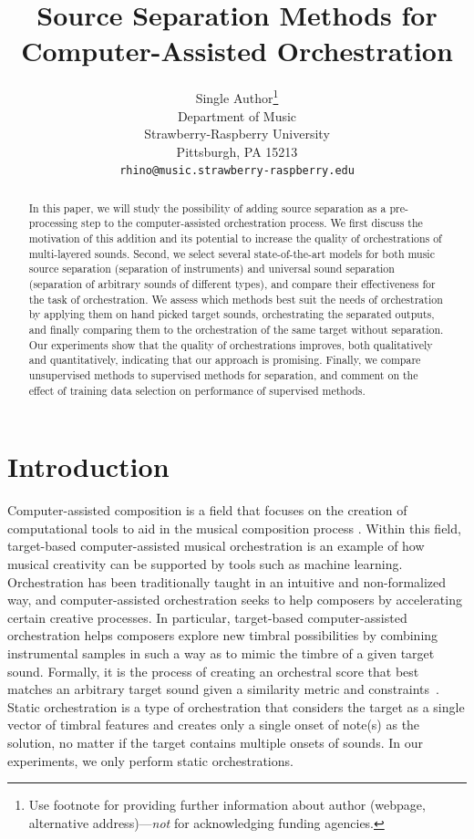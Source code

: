 \documentclass[letterpaper]{article}  %
\title{Source Separation Methods for Computer-Assisted Orchestration}
\author{%
  Single Author\thanks{Use footnote for providing further information
    about author (webpage, alternative address)---\emph{not} for acknowledging
    funding agencies.} \\
  Department of Music\\
  Strawberry-Raspberry University\\
  Pittsburgh, PA 15213 \\
  \texttt{rhino@music.strawberry-raspberry.edu} \\
}
\begin{document}
\maketitle

\begin{abstract}
  In this paper, we will study the possibility of adding source separation as a pre-processing step to the computer-assisted orchestration process. We first discuss the motivation of this addition and its potential to increase the quality of orchestrations of multi-layered sounds. Second, we select several state-of-the-art models for both music source separation (separation of instruments) and universal sound separation (separation of arbitrary sounds of different types), and compare their effectiveness for the task of orchestration. We assess which methods best suit the needs of orchestration by applying them on hand picked target sounds, orchestrating the separated outputs, and finally comparing them to the orchestration of the same target without separation. Our experiments show that the quality of orchestrations improves, both qualitatively and quantitatively, indicating that our approach is promising. Finally, we compare unsupervised methods to supervised methods for separation, and comment on the effect of training data selection on performance of supervised methods.
\end{abstract}

\section{Introduction}\label{sec:introduction}
  Computer-assisted composition is a field that focuses on the creation of computational tools to aid in the musical composition process \cite{FerVic2013, Ari2005}. Within this field, target-based computer-assisted musical orchestration is an example of how musical creativity can be supported by tools such as machine learning. Orchestration has been traditionally taught in an intuitive and non-formalized way, and computer-assisted orchestration seeks to help composers by accelerating certain creative processes. In particular, target-based computer-assisted orchestration helps composers explore new timbral possibilities by combining instrumental samples in such a way as to mimic the timbre of a given target sound. Formally, it is the process of creating an orchestral score that best matches an arbitrary target sound given a similarity metric and constraints~\cite{Maresz2003}. Static orchestration is a type of orchestration that considers the target as a single vector of timbral features and creates only a single onset of note(s) as the solution, no matter if the target contains multiple onsets of sounds. In our experiments, we only perform static orchestrations.
\end{document}
